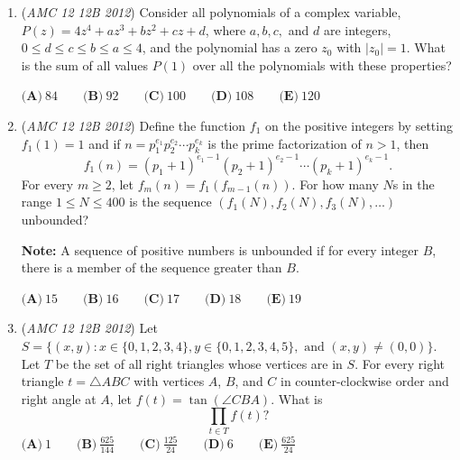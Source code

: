 \begin{enumerate}
$\textbf{(A)}\ 2112\qquad\textbf{(B)}\ 2304\qquad\textbf{(C)}\ 2368\qquad\textbf{(D)}\ 2384\qquad\textbf{(E)}\ 2400$


	\item (\textit{AMC 12 12B 2012}) Consider all polynomials of a complex variable, $P(z)=4z^4+az^3+bz^2+cz+d$, where $a,b,c,$ and $d$ are integers, $0\le d\le c\le b\le a\le 4$, and the polynomial has a zero $z_0$ with $|z_0|=1.$ What is the sum of all values $P(1)$ over all the polynomials with these properties?


 $\textbf{(A)}\ 84\qquad\textbf{(B)}\ 92\qquad\textbf{(C)}\ 100\qquad\textbf{(D)}\ 108\qquad\textbf{(E)}\ 120$


	\item (\textit{AMC 12 12B 2012}) Define the function $f_1$ on the positive integers by setting $f_1(1)=1$ and if $n=p_1^{e_1}p_2^{e_2}\cdots p_k^{e_k}$ is the prime factorization of $n>1$, then 
 \[f_1(n)=(p_1+1)^{e_1-1}(p_2+1)^{e_2-1}\cdots (p_k+1)^{e_k-1}.\]
For every $m\ge 2$, let $f_m(n)=f_1(f_{m-1}(n))$. For how many $N$s in the range $1\le N\le 400$ is the sequence $(f_1(N),f_2(N),f_3(N),\dots )$ unbounded?


 \textbf{Note:} A sequence of positive numbers is unbounded if for every integer $B$, there is a member of the sequence greater than $B$.


 $\textbf{(A)}\ 15\qquad\textbf{(B)}\ 16\qquad\textbf{(C)}\ 17\qquad\textbf{(D)}\ 18\qquad\textbf{(E)}\ 19$


	\item (\textit{AMC 12 12B 2012}) Let $S=\{(x,y) : x\in \{0,1,2,3,4\}, y\in \{0,1,2,3,4,5\},\text{ and } (x,y)\ne (0,0)\}$. 
Let $T$ be the set of all right triangles whose vertices are in $S$. For every right triangle $t=\triangle{ABC}$ with vertices $A$, $B$, and $C$ in counter-clockwise order and right angle at $A$, let $f(t)=\tan(\angle{CBA})$. What is 
 \[\prod_{t\in T} f(t)?\]
$\textbf{(A)}\ 1\qquad\textbf{(B)}\ \frac{625}{144}\qquad\textbf{(C)}\ \frac{125}{24}\qquad\textbf{(D)}\ 6\qquad\textbf{(E)}\ \frac{625}{24}$


\end{enumerate}